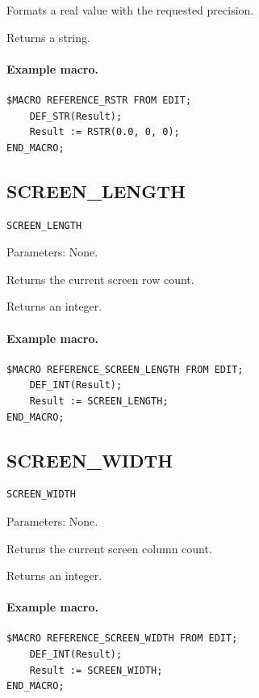 \documentclass[a4paper,10pt,twoside,openany]{book}
\begin{document}
Formats a real value with the requested precision.

Returns a string.

\paragraph{Example macro.}
\begin{verbatim}
$MACRO REFERENCE_RSTR FROM EDIT;
    DEF_STR(Result);
    Result := RSTR(0.0, 0, 0);
END_MACRO;
\end{verbatim}

\label{prim:intrinsic-screen-length}
\subsection*{SCREEN\_LENGTH}
\begin{verbatim}
SCREEN_LENGTH
\end{verbatim}
Parameters: None.

Returns the current screen row count.

Returns an integer.

\paragraph{Example macro.}
\begin{verbatim}
$MACRO REFERENCE_SCREEN_LENGTH FROM EDIT;
    DEF_INT(Result);
    Result := SCREEN_LENGTH;
END_MACRO;
\end{verbatim}

\label{prim:intrinsic-screen-width}
\subsection*{SCREEN\_WIDTH}
\begin{verbatim}
SCREEN_WIDTH
\end{verbatim}
Parameters: None.

Returns the current screen column count.

Returns an integer.

\paragraph{Example macro.}
\begin{verbatim}
$MACRO REFERENCE_SCREEN_WIDTH FROM EDIT;
    DEF_INT(Result);
    Result := SCREEN_WIDTH;
END_MACRO;
\end{verbatim}
\end{document}
